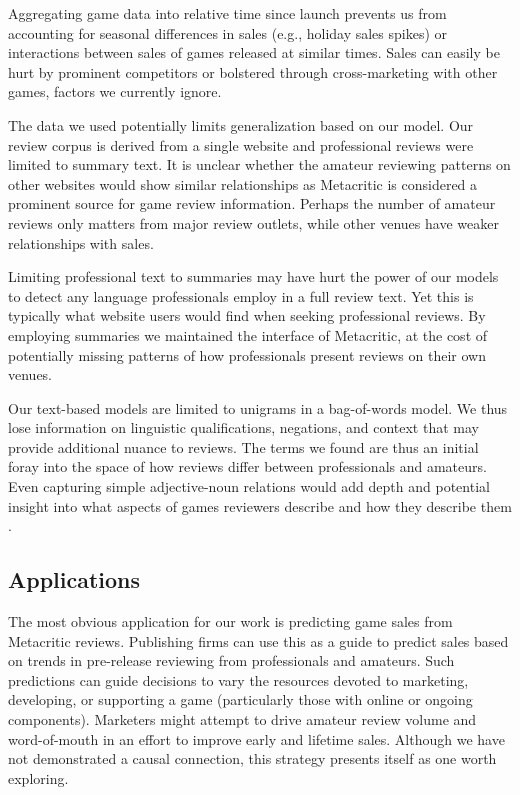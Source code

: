 \documentclass[letterpaper]{article}
\begin{document}
Aggregating game data into relative time since launch prevents us from accounting for seasonal differences in sales (e.g., holiday sales spikes) or interactions between sales of games released at similar times. Sales can easily be hurt by prominent competitors or bolstered through cross-marketing with other games, factors we currently ignore.

The data we used potentially limits generalization based on our model. Our review corpus is derived from a single website and professional reviews were limited to summary text. It is unclear whether the amateur reviewing patterns on other websites would show similar relationships as Metacritic is considered a prominent source for game review information. Perhaps the number of amateur reviews only matters from major review outlets, while other venues have weaker relationships with sales.

Limiting professional text to summaries may have hurt the power of our models to detect any language professionals employ in a full review text. Yet this is typically what website users would find when seeking professional reviews. By employing summaries we maintained the interface of Metacritic, at the cost of potentially missing patterns of how professionals present reviews on their own venues.

Our text-based models are limited to unigrams in a bag-of-words model. We thus lose information on linguistic qualifications, negations, and context that may provide additional nuance to reviews. The terms we found are thus an initial foray into the space of how reviews differ between professionals and amateurs. Even capturing simple adjective-noun relations would add depth and potential insight into what aspects of games reviewers describe and how they describe them \cite{zagal2011natural}.

\subsection{Applications}
The most obvious application for our work is predicting game sales from Metacritic reviews. Publishing firms can use this as a guide to predict sales based on trends in pre-release reviewing from professionals and amateurs. Such predictions can guide decisions to vary the resources devoted to marketing, developing, or supporting a game (particularly those with online or ongoing components). Marketers might attempt to drive amateur review volume and word-of-mouth in an effort to improve early and lifetime sales. Although we have not demonstrated a causal connection, this strategy presents itself as one worth exploring.
\end{document}
